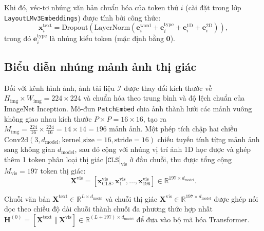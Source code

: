 Khi đó, véc-tơ nhúng văn bản chuẩn hóa của token thứ $i$ (cài đặt trong lớp \texttt{LayoutLMv3Embeddings}) được tính bởi công thức:
\begin{equation}
    \label{eq:base_text_emb}
    \mathbf{x}_i^{\text{text}} = \text{Dropout}\!\left(\text{LayerNorm}\!\left(\mathbf{e}_i^{\text{word}} + \mathbf{e}_i^{\text{type}} + \mathbf{e}_i^{\text{1D}} + \mathbf{e}_i^{\text{2D}}\right)\right),
\end{equation}
trong đó $\mathbf{e}_i^{\text{type}}$ là nhúng kiểu token (mặc định bằng $\mathbf{0}$).

\subsection{Biểu diễn nhúng mảnh ảnh thị giác}
Đối với kênh hình ảnh, ảnh tài liệu $\mathcal{I}$ được thay đổi kích thước về $H_{\text{img}} \times W_{\text{img}} = 224 \times 224$ và chuẩn hóa theo trung bình và độ lệch chuẩn của ImageNet Inception. Mô-đun \texttt{PatchEmbed} chia ảnh thành lưới các mảnh vuông không giao nhau kích thước $P \times P = 16 \times 16$, tạo ra $M_{\text{img}} = \frac{224}{16} \times \frac{224}{16} = 14 \times 14 = 196$ mảnh ảnh. Một phép tích chập hai chiều $\text{Conv2d}(3, d_{\text{model}}, \text{kernel\_size}=16, \text{stride}=16)$ chiếu tuyến tính từng mảnh ảnh sang không gian $d_{\text{model}}$, sau đó cộng với nhúng vị trí ảnh 1D học được và ghép thêm 1 token phân loại thị giác $\texttt{[CLS]}_{\text{vis}}$ ở đầu chuỗi, thu được tổng cộng $M_{\text{vis}} = 197$ token thị giác:
\begin{equation}
    \label{eq:visual_tokens}
    \mathbf{X}^{\text{vis}} = \left[ \mathbf{x}_{\text{CLS}}^{\text{vis}}, \mathbf{x}_1^{\text{vis}}, \dots, \mathbf{x}_{196}^{\text{vis}} \right] \in \mathbb{R}^{197 \times d_{\text{model}}}.
\end{equation}

Chuỗi văn bản $\mathbf{X}^{\text{text}} \in \mathbb{R}^{L \times d_{\text{model}}}$ và chuỗi thị giác $\mathbf{X}^{\text{vis}} \in \mathbb{R}^{197 \times d_{\text{model}}}$ được ghép nối dọc theo chiều độ dài chuỗi thành chuỗi đa phương thức hợp nhất $\mathbf{H}^{(0)} = [\mathbf{X}^{\text{text}} \;\Vert\; \mathbf{X}^{\text{vis}}] \in \mathbb{R}^{(L + 197) \times d_{\text{model}}}$ để đưa vào bộ mã hóa Transformer.


